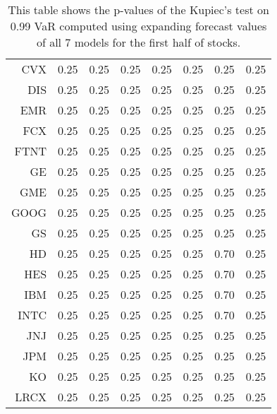 \begin{table}[ht]
\begin{tabular}{rrrrrrrr}
  CVX & 0.25 & 0.25 & 0.25 & 0.25 & 0.25 & 0.25 & 0.25 \\ 
  DIS & 0.25 & 0.25 & 0.25 & 0.25 & 0.25 & 0.25 & 0.25 \\ 
  EMR & 0.25 & 0.25 & 0.25 & 0.25 & 0.25 & 0.25 & 0.25 \\ 
  FCX & 0.25 & 0.25 & 0.25 & 0.25 & 0.25 & 0.25 & 0.25 \\ 
  FTNT & 0.25 & 0.25 & 0.25 & 0.25 & 0.25 & 0.25 & 0.25 \\ 
  GE & 0.25 & 0.25 & 0.25 & 0.25 & 0.25 & 0.25 & 0.25 \\ 
  GME & 0.25 & 0.25 & 0.25 & 0.25 & 0.25 & 0.25 & 0.25 \\ 
  GOOG & 0.25 & 0.25 & 0.25 & 0.25 & 0.25 & 0.25 & 0.25 \\ 
  GS & 0.25 & 0.25 & 0.25 & 0.25 & 0.25 & 0.25 & 0.25 \\ 
  HD & 0.25 & 0.25 & 0.25 & 0.25 & 0.25 & 0.70 & 0.25 \\ 
  HES & 0.25 & 0.25 & 0.25 & 0.25 & 0.25 & 0.70 & 0.25 \\ 
  IBM & 0.25 & 0.25 & 0.25 & 0.25 & 0.25 & 0.70 & 0.25 \\ 
  INTC & 0.25 & 0.25 & 0.25 & 0.25 & 0.25 & 0.70 & 0.25 \\ 
  JNJ & 0.25 & 0.25 & 0.25 & 0.25 & 0.25 & 0.25 & 0.25 \\ 
  JPM & 0.25 & 0.25 & 0.25 & 0.25 & 0.25 & 0.25 & 0.25 \\ 
  KO & 0.25 & 0.25 & 0.25 & 0.25 & 0.25 & 0.25 & 0.25 \\ 
  LRCX & 0.25 & 0.25 & 0.25 & 0.25 & 0.25 & 0.25 & 0.25 \\ 
   \hline
\end{tabular}
\caption[Kupiec's test p-values, alpha =0.99 (1)]{This table shows the p-values of the Kupiec's test on 0.99 VaR computed using expanding forecast values of all 7 models for the first half of stocks.} 
\label{Table:Kupiec_test_expanding_0.99_1}
\end{table}
